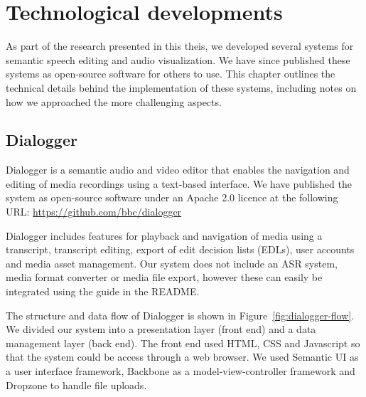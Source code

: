 \chapter{Technological developments}\label{app:tech}

As part of the research presented in this theis, we developed several systems for semantic speech editing and audio
visualization. We have since published these systems as open-source software for others to use. This chapter outlines
the technical details behind the implementation of these systems, including notes on how we approached the more
challenging aspects.

\section{Dialogger}\label{sec:dialogger}

Dialogger is a semantic audio and video editor that enables the navigation and editing of media recordings using a
text-based interface. We have published the system as open-source software under an Apache 2.0 licence at the following
URL: \url{https://github.com/bbc/dialogger}



Dialogger includes features for playback and navigation of media using a transcript, transcript editing, export of edit
decision lists (EDLs), user accounts and media asset management. Our system does not include an ASR system, media
format converter or media file export, however these can easily be integrated using the guide in the README.

The structure and data flow of Dialogger is shown in Figure~\ref{fig:dialogger-flow}. We divided our system into a
presentation layer (front end) and a data management layer (back end). The front end used HTML, CSS and Javascript so
that the system could be access through a web browser.  We used Semantic UI as a user interface framework, Backbone as
a model-view-controller framework and Dropzone to handle file uploads.

